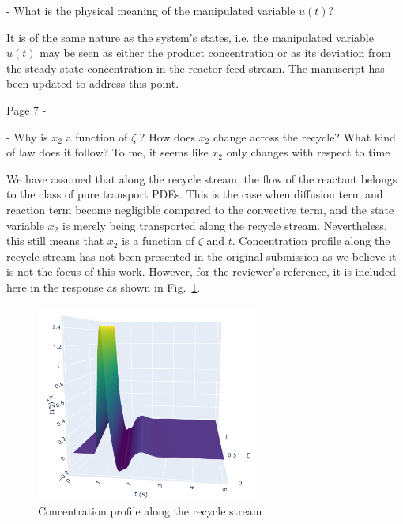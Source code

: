 \documentclass[12pt,answers]{exam}
\begin{document}
\begin{questions}
    - What is the physical meaning of the manipulated variable $u(t)$?

    \begin{solutionorbox}
        It is of the same nature as the system's states, i.e. the manipulated variable $u(t)$ may be seen as either the product concentration or as its deviation from the steady-state concentration in the reactor feed stream. The manuscript has been updated to address this point.
    \end{solutionorbox}


    \question Page 7 - 

    - Why is $x_2$ a function of $\zeta$ ? How does $x_2$ change across the recycle? What kind of law does it follow? To me, it seems like $x_2$ only changes with respect to time

    \begin{solutionorbox}
        We have assumed that along the recycle stream, the flow of the reactant belongs to the class of pure transport PDEs. This is the case when diffusion term and reaction term become negligible compared to the convective term, and the state variable $x_2$ is merely being transported along the recycle stream. Nevertheless, this still means that $x_2$ is a function of $\zeta$ and $t$. Concentration profile along the recycle stream has not been presented in the original submission as we believe it is not the focus of this work. However, for the reviewer's reference, it is included here in the response as shown in Fig.~\ref{fig:x2}.
    \end{solutionorbox}

\begin{figure}[H]
    \centering
    \includegraphics[width=0.65\textwidth]{x2_vs_z.png}
    \caption{Concentration profile along the recycle stream}
    \label{fig:x2}
\end{figure}


\end{questions}
\end{document}
